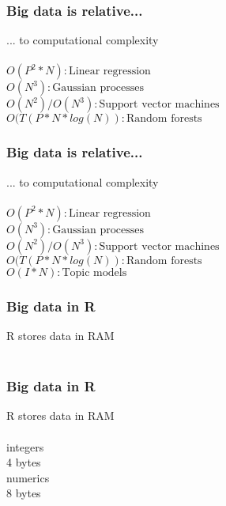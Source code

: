 \documentclass{beamer}
\begin{document}
\begin{frame}
	\frametitle{Big data is relative...}
	\begin{center}
		... to computational complexity\\~\\
		$O(P^2 * N) : \text{Linear regression}$\\
		$O(N^3) : \text{Gaussian processes}$\\
		$O(N^2) / O(N^3) : \text{Support vector machines}$\\
		$O(T(P * N * log(N)) : \text{Random forests}$\\
	\end{center}
\end{frame}

\begin{frame}
	\frametitle{Big data is relative...}
	\begin{center}
		... to computational complexity\\~\\
		$O(P^2 * N) : \text{Linear regression}$\\
		$O(N^3) : \text{Gaussian processes}$\\
		$O(N^2) / O(N^3) : \text{Support vector machines}$\\
		$O(T(P * N * log(N)) : \text{Random forests}$\\
		$O(I * N) : \text{Topic models}$\\
	\end{center}
\end{frame}

\begin{frame}
	\frametitle{Big data in R}
	\begin{center}
		R stores data in RAM\\~\\
	\end{center}
\end{frame}

\begin{frame}
	\frametitle{Big data in R}
	\begin{center}
		R stores data in RAM\\~\\
		integers\\
		4 bytes\\
		numerics\\
		8 bytes\\~\\
	\end{center}
\end{frame}
\end{document}
